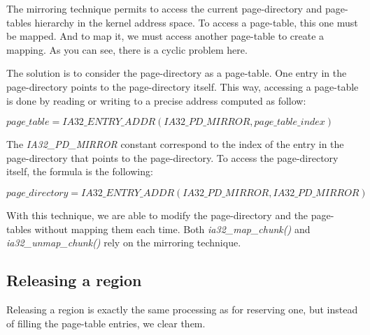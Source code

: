 The mirroring technique permits to access the current page-directory
and page-tables hierarchy in the kernel address space. To access a
page-table, this one must be mapped. And to map it, we must access
another page-table to create a mapping. As you can see, there is a
cyclic problem here.

The solution is to consider the page-directory as a page-table. One
entry in the page-directory points to the page-directory itself. This
way, accessing a page-table is done by reading or writing to a precise
address computed as follow:

$page\_table = IA32\_ENTRY\_ADDR(IA32\_PD\_MIRROR, page\_table\_index)$

The \textit{IA32\_PD\_MIRROR} constant correspond to the index of the entry
in the page-directory that points to the page-directory. To access the
page-directory itself, the formula is the following:

$page\_directory = IA32\_ENTRY\_ADDR(IA32\_PD\_MIRROR, IA32\_PD\_MIRROR)$

With this technique, we are able to modify the page-directory and the
page-tables without mapping them each time. Both
\textit{ia32\_map\_chunk()} and \textit{ia32\_unmap\_chunk()} rely on
the mirroring technique.

%
%

\subsection{Releasing a region}

Releasing a region is exactly the same processing as for reserving
one, but instead of filling the page-table entries, we clear them.

